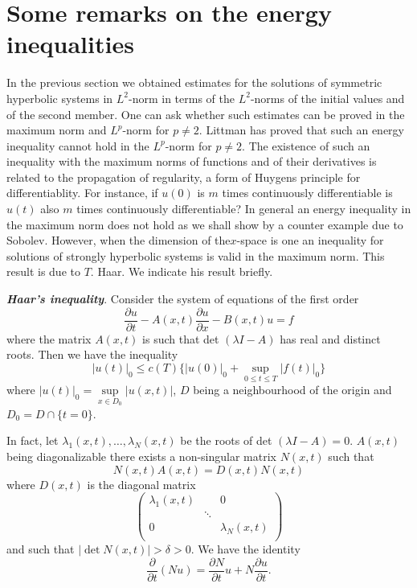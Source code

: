 \section{Some remarks on the energy inequalities}\label{chap3-sec2}%

In the previous section we obtained estimates for the solutions of
symmetric hyperbolic systems in $L^2$-norm in terms of the $L^2$-norms
of the initial values and of the second member. One can ask whether
such estimates can be proved in the maximum norm and $L^p$-norm for $p
\neq 2$. Littman \cite{key1} has proved that such an energy inequality cannot
hold in the $L^p$-norm for $p\neq 2$. The existence of such an
inequality with the maximum norms of functions and of their
derivatives is related to the propagation of regularity, a form of
Huygens principle for differentiablity. For instance, if $u(0)$ is
$m$ times continuously differentiable is $u(t)$ also $m$ times
continuously differentiable? In general an energy inequality in the
maximum norm does not hold as we shall show by a counter example due
to Sobolev. However, when the dimension of the\pageoriginale $x$-space
is one an 
inequality for solutions of strongly hyperbolic systems is valid in
the maximum norm. This result is due to $T$. Haar. We indicate his
result briefly. 

\smallskip
\noindent
\textbf{\textit{Haar's inequality}}. Consider the system of equations
of the first order  
\begin{equation}
\frac{\partial u}{\partial t} - A (x,t) \frac{\partial u}{\partial x}
- B (x, t) u = f \tag{2.1}\label{chap3-eq2.1}  
\end{equation}
where the matrix $A(x, t)$ is such that det $(\lambda I-A)$ has real
and distinct roots. Then we have the inequality 
\begin{equation}
| u (t) |_0 \leq c (T) \bigg\{ | u (0) |_0 + \sup\limits_{0 \leq t
  \leq T}| f (t) |_0 \bigg\} \tag{2.2}\label{chap3-eq2.2} 
\end{equation}
where $| u (t)|_0 = \sup\limits_{x \in D_0} | u (x, t) |$, $D$  being a
neighbourhood of the origin and $D_0 = D \cap \{t = 0\}$. 

In fact, let $\lambda _1 (x, t), \ldots, \lambda_N (x, t)$ be the
roots of det $(\lambda I-A) = 0$. $A(x, t)$ being diagonalizable there
exists a non-singular matrix $N(x, t)$ such that  
$$
N(x, t) A (x, t) = D (x, t) N (x, t) 
$$ 
where $D(x, t)$ is the diagonal matrix
$$
\begin{pmatrix} 
\lambda_1 (x, t)  & & 0\\
&\ddots&\\ 
0 & & \lambda_{N} (x, t)\\
\end{pmatrix}
$$
and such that $|\det N (x, t)| > \delta > 0$. We have the identity 
$$
\frac{\partial}{\partial t} (N u) = \frac{\partial N}{\partial t} u +
N \frac{\partial  u}{\partial t}. 
$$


